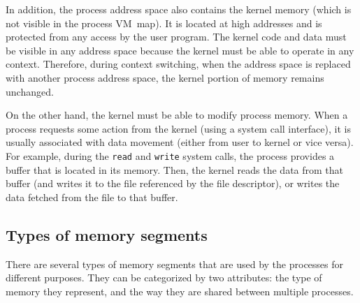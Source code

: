 In addition, the process address space also contains the kernel memory (which is not visible in the process VM~map).
It is located at high addresses and is protected from any access by the user program.
The kernel code and data must be visible in any address space because the kernel must be able to operate in any context.
Therefore, during context switching, when the address space is replaced with another process address space,
the kernel portion of memory remains unchanged.

On the other hand, the kernel must be able to modify process memory.
When a process requests some action from the kernel (using a system call interface), it is usually associated
with data movement (either from user to kernel or vice versa).
For example, during the \texttt{read} and \texttt{write} system calls, the process provides a buffer that is located in its memory.
Then, the kernel reads the data from that buffer (and writes it to the file referenced by the file descriptor),
or writes the data fetched from the file to that buffer.

\subsection{Types of memory segments}

There are several types of memory segments that are used by the processes for different purposes.
They can be categorized by two attributes: the type of memory they represent,
and the way they are shared between multiple processes.

